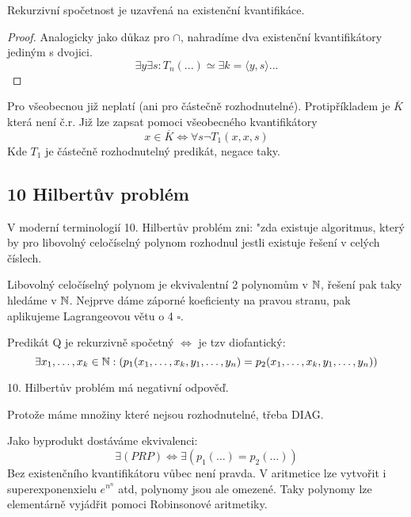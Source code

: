 \begin{theorem}\label{neomez_kvant}
	Rekurzivní spočetnost je uzavřená na existenční kvantifikáce.
\end{theorem}
\begin{proof}
	Analogicky jako důkaz pro $\cap$, nahradíme dva existenční kvantifikátory jediným s dvojici.
	\[ \exists y \exists s: T_n(...) \simeq \exists k = \langle y, s \rangle ... \]
\end{proof}

\begin{note}
	Pro všeobecnou již neplatí (ani pro částečně rozhodnutelné).
	Protipříkladem je $\overline{K}$ která není č.r.
	Již lze zapsat pomoci všeobecného kvantifikátory
	\[ x \in \overline{K} \iff \forall s \neg T_1(x, x, s) \]
	Kde $T_1$ je částečně rozhodnutelný predikát, negace taky.
\end{note}

\subsection{10 Hilbertův problém}

V moderní terminologií 10. Hilbertův problém zni: "zda existuje algoritmus, který by pro libovolný celočíselný polynom rozhodnul jestli existuje řešení v celých číslech.

Libovolný celočíselný polynom je ekvivalentní 2 polynomům v $\operatorname{\mathbb{N}}$, řešení pak taky hledáme v $\operatorname{\mathbb{N}}$.
Nejprve dáme záporné koeficienty na pravou stranu, pak aplikujeme Lagrangeovou větu o 4 $\square$.

\begin{theorem}[RDPM (BD)]\label{rdpm}
	Predikát Q je rekurzivně spočetný $\iff$ je tzv diofantický:
		\[ \exists x_1, \ldots, x_k \in \operatorname{\mathbb{N}}: (p_1(x_1, \ldots, x_k, y_1, \ldots, y_n) = p_2(x_1, \ldots, x_k, y_1, \ldots, y_n)) \]
\end{theorem}

\begin{consequence}
	10. Hilbertův problém má negativní odpověď.

	Protože máme množiny které nejsou rozhodnutelné, třeba DIAG.
\end{consequence}

\begin{amendment}\label{rdpm_am}
	Jako byprodukt dostáváme ekvivalenci:
	\[ \exists(PRP) \iff \exists(p_1(\ldots) = p_2(\ldots)) \]
	Bez existenčního kvantifikátoru vůbec není pravda.
	V aritmetice lze vytvořit i superexponenxielu $e^{n^n}$ atd, polynomy jsou ale omezené.
	Taky polynomy lze elementárně vyjádřit pomoci Robinsonové aritmetiky.
\end{amendment}

